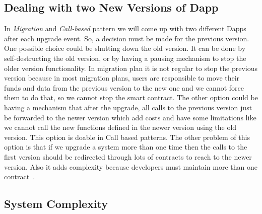 \subsection{Dealing with two New Versions of Dapp}
In \textit{Migration} and \textit{Call-based} pattern we will come up with two different Dapps after each upgrade event. So, a decision must be made for the previous version. One possible choice could be shutting down the old version. It can be done by self-destructing the old version, or by having a pausing mechanism to stop the older version functionality. In migration plan it is not regular to stop the previous version because in most migration plans, users are responsible to move their funds and data from the previous version to the new one and we cannot force them to do that, so we cannot stop the smart contract. 
The other option could be having a mechanism that after the upgrade, all calls to the previous version just be forwarded to the newer version which add costs and have some limitations like we cannot call the new functions defined in the newer version using the old version. This option is doable in Call based patterns. The other problem of this option is that if we upgrade a system more than one time then the calls to the first version should be redirected through lots of contracts to reach to the newer version. Also it adds complexity because developers must maintain more than one contract~\cite{tobBlogPost}.


\subsection{System Complexity} \label{sysComplexity}

